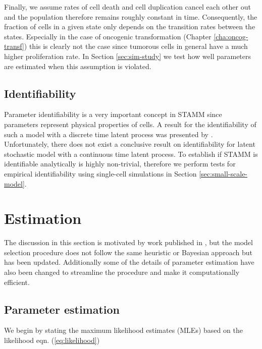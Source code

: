 Finally, we assume rates of cell death and cell duplication cancel each other out and the population therefore remains roughly constant in time. Consequently, the fraction of cells in a given state only depends on the transition rates between the states. Especially in the case of oncogenic transformation (Chapter \ref{cha:oncog-transf}) this is clearly not the case since tumorous cells in general have a much higher proliferation rate. In Section \ref{sec:sim-study} we test how well parameters are estimated when this assumption is violated.

\subsection{Identifiability}
\label{sec:identifiability}

Parameter identifiability is a very important concept in STAMM since parameters represent physical properties of cells. A result for the identifiability of such a model with a discrete time latent process was presented by \cite{Clifford:1977wa}. Unfortunately, there does not exist a conclusive result on identifiability for latent stochastic model with a continuous time latent process. To establish if STAMM is identifiable analytically is highly non-trivial, therefore we perform tests for empirical identifiability using single-cell simulations in Section \ref{sec:small-scale-model}.

\section{Estimation}
\label{sec:estimation}

The discussion in this section is motivated by work published in \cite{Armond:2013}, but the model selection procedure does not follow  the same heuristic or Bayesian approach but has been updated. Additionally some of the details of parameter estimation have also been changed to streamline the procedure and make it computationally efficient.

\subsection{Parameter estimation}
\label{sec:parameter-estimation}

We begin by stating the maximum likelihood estimates (MLEs) based on the likelihood eqn. (\ref{eq:likelihood})

